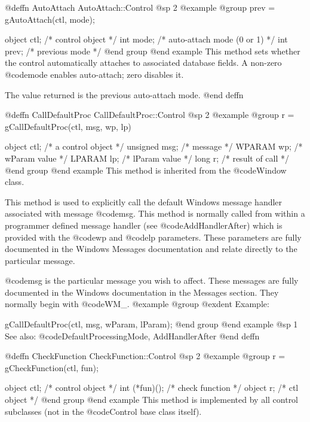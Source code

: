 @deffn {AutoAttach} AutoAttach::Control
@sp 2
@example
@group
prev = gAutoAttach(ctl, mode);

object  ctl;    /*  control object  */
int     mode;   /*  auto-attach mode (0 or 1)  */
int     prev;   /*  previous mode   */
@end group
@end example
This method sets whether the control automatically attaches to
associated database fields.  A non-zero @code{mode} enables
auto-attach; zero disables it.

The value returned is the previous auto-attach mode.
@end deffn



@deffn {CallDefaultProc} CallDefaultProc::Control
@sp 2
@example
@group
r = gCallDefaultProc(ctl, msg, wp, lp)

object   ctl;   /*  a control object  */
unsigned msg;   /*  message           */
WPARAM   wp;    /*  wParam value      */
LPARAM   lp;    /*  lParam value      */
long     r;     /*  result of call    */
@end group
@end example
This method is inherited from the @code{Window} class.

This method is used to explicitly call the default Windows message handler
associated with message @code{msg}.  This method is normally called from
within a programmer defined message handler (see @code{AddHandlerAfter})
which is provided with the @code{wp} and @code{lp} parameters.  These
parameters are fully documented in the Windows Messages documentation
and relate directly to the particular message.

@code{msg} is the particular message you wish to affect.  These messages
are fully documented in the Windows documentation in the Messages
section.  They normally begin with @code{WM_}.
@example
@group
@exdent Example:

gCallDefaultProc(ctl, msg, wParam, lParam);
@end group
@end example
@sp 1
See also:  @code{DefaultProcessingMode, AddHandlerAfter}
@end deffn















@deffn {CheckFunction} CheckFunction::Control
@sp 2
@example
@group
r = gCheckFunction(ctl, fun);

object  ctl;      /*  control object  */
int     (*fun)(); /*  check function  */
object  r;        /*  ctl object      */
@end group
@end example
This method is implemented by all control subclasses (not in the
@code{Control} base class itself).

